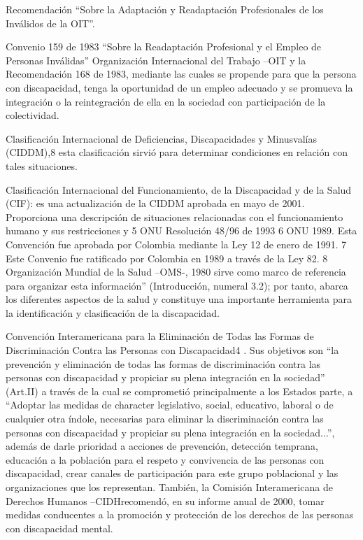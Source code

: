 \documentclass[a4paper, 12pt, oneside]{article}
\begin{document}
	Recomendación “Sobre la Adaptación y Readaptación Profesionales de los Inválidos de la OIT”.

	Convenio 159 de 1983 “Sobre la Readaptación Profesional y el Empleo de Personas Inválidas” Organización Internacional del Trabajo –OIT y la Recomendación 168 de 1983, mediante las cuales se propende para que la persona con discapacidad, tenga la oportunidad de un empleo adecuado y se promueva la integración o la reintegración de ella en la sociedad con participación de la colectividad.

	Clasificación Internacional de Deficiencias, Discapacidades y Minusvalías (CIDDM),8 esta clasificación sirvió para determinar condiciones en relación con tales situaciones.

	Clasificación Internacional del Funcionamiento, de la Discapacidad y de la Salud (CIF): es una actualización de la CIDDM aprobada en mayo de 2001. Proporciona una descripción de situaciones relacionadas con el funcionamiento humano y sus restricciones y 5 ONU Resolución 48/96 de 1993 6 ONU 1989. Esta Convención fue aprobada por Colombia mediante la Ley 12 de enero de 1991. 7 Este Convenio fue ratificado por Colombia en 1989 a través de la Ley 82. 8 Organización Mundial de la Salud –OMS-, 1980 sirve como marco de referencia para organizar esta información” (Introducción, numeral 3.2); por tanto, abarca los diferentes aspectos de la salud y constituye una importante herramienta para la identificación y clasificación de la discapacidad.

	Convención Interamericana para la Eliminación de Todas las Formas de Discriminación Contra las Personas con Discapacidad4 . Sus objetivos son “la prevención y eliminación de todas las formas de discriminación contra las personas con discapacidad y propiciar su plena integración en la sociedad” (Art.II) a través de la cual se comprometió principalmente a los Estados parte, a “Adoptar las medidas de character legislativo, social, educativo, laboral o de cualquier otra índole, necesarias para eliminar la discriminación contra las personas con discapacidad y propiciar su plena integración en la sociedad...”, además de darle prioridad a acciones de prevención, detección temprana, educación a la población para el respeto y convivencia de las personas con discapacidad, crear canales de participación para este grupo poblacional y las organizaciones que los representan. También, la Comisión Interamericana de Derechos Humanos –CIDHrecomendó, en su informe anual de 2000, tomar medidas conducentes a la promoción y protección de los derechos de las personas con discapacidad mental.
\end{document}
